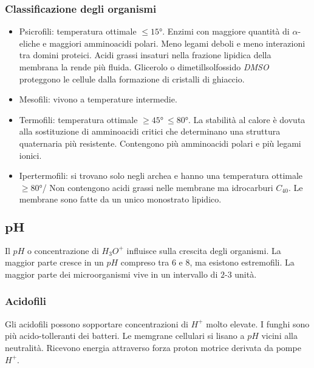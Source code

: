 		\subsubsection{Classificazione degli organismi}
		\begin{multicols}{2}
			\begin{itemize}
				\item Psicrofili: temperatura ottimale $\le 15\si{\degree}$.
					Enzimi con maggiore quantit\`a di $\alpha$-eliche e maggiori amminoacidi polari.
					Meno legami deboli e meno interazioni tra domini proteici.
					Acidi grassi insaturi nella frazione lipidica della membrana la rende pi\`u fluida.
					Glicerolo o dimetillsolfossido \emph{DMSO} proteggono le cellule dalla formazione di cristalli di ghiaccio.
				\item Mesofili: vivono a temperature intermedie.
				\item Termofili: temperatura ottimale $\ge 45\si{\degree}\ \le 80\si{\degree}$.
					La stabilit\`a al calore \`e dovuta alla sostituzione di amminoacidi critici che determinano una struttura quaternaria pi\`u resistente.
					Contengono pi\`u amminoacidi polari e pi\`u legami ionici.
				\item Ipertermofili: si trovano solo negli archea e hanno una temperatura ottimale $\ge 80\si{\degree}$/
					Non contengono acidi grassi nelle membrane ma idrocarburi \emph{$C_40$}.
					Le membrane sono fatte da un unico monostrato lipidico. 
			\end{itemize}
		\end{multicols}

	\subsection{$\mathbf{pH}$}
	Il $pH$ o concentrazione di \emph{$H_3O^+$} influisce sulla crescita degli organismi.
	La maggior parte cresce in un $pH$ compreso tra $6$ e $8$, ma esistono estremofili.
	La maggior parte dei microorganismi vive in un intervallo di $2$-$3$ unit\`a.

		\subsubsection{Acidofili}
		Gli acidofili possono sopportare concentrazioni di \emph{$H^+$} molto elevate.
		I funghi sono pi\`u acido-tolleranti dei batteri.
		Le memgrane cellulari si lisano a $pH$ vicini alla neutralit\`a.
		Ricevono energia attraverso forza proton motrice derivata da pompe \emph{$H^+$}.

